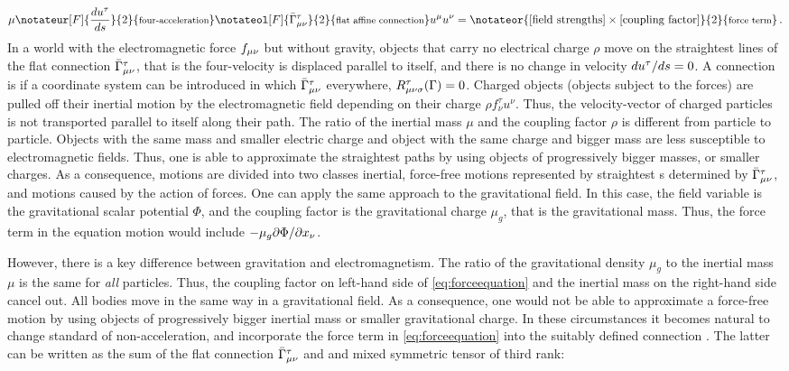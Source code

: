 \documentclass[submitted]{article}
\newcommand{\texts}[1]{\text{\footnotesize{#1}}}
\newcommand{\faraday}{\ensuremath{f}}
\newcommand{\christoffelmnt}{\christoffel{\mu}{\nu}{\tau}}
\newcommand{\Gtmnbar}{\ensuremath{\bar{\Gamma}\tmn}\xspace}
\begin{document}
\begin{equation}
\label{eq:forceequation} 
\mu \notateur[F]{\frac{du^\tau}{\dap}}{2}{\texts{four-acceleration}} \notateol[F]{\Gtmnbar}{2}{\texts{flat affine connection}} u^\mu u^\nu = \notateor{\text{[field strengths]} \times \text{[coupling factor]}}{2}{\texts{force term}} \,.
\end{equation}
In a world with the electro­magnetic force $\faraday\mn$ but without gravity, objects that carry no electrical charge $\rho$ move on the straightest lines of the flat connection $\Gtmnbar$, that is the four-velocity is displaced parallel to itself, and there is no change in velocity ${du^\tau}/{ds}=0$. A connection is  if a coordinate system can be introduced in which $\Gtmnbar$ everywhere, \ie $R_{\mu \nu \sigma}^{\tau}(\Gamma)=0$. Charged objects (objects subject to the forces) are pulled off their inertial motion by the electromagnetic field depending on their charge $\rho f^\tau_\nu u^\nu$. Thus, the velocity-vector of charged particles is not transported parallel to itself along their path. The ratio of the inertial mass $\mu$ and the coupling factor $\rho$ is different from particle to particle. Objects with the same mass and smaller electric charge and object with the same charge and bigger mass are less susceptible to electromagnetic fields. Thus, one is able to approximate the straightest paths by using objects of progressively bigger masses, or smaller charges. As a consequence, motions are divided into two classes inertial, force-free motions represented by straightest \wl{}s determined by $\Gtmnbar$, and motions caused by the action of forces. One can apply the same approach to the gravitational field. In this case, the field variable is the gravitational scalar potential $\Phi$, and the coupling factor is the gravitational charge $\mu_g$, that is the gravitational mass. Thus, the force term in the equation motion would include $-\mu_g {\partial \Phi}/{\partial x_\nu}$. 


However, there is a key difference between gravitation and  electromagnetism. The ratio of the gravitational  density $\mu_g$ to the inertial mass $\mu$ is the same for \emph{all} particles. Thus, the coupling factor on left-hand side of \cref{eq:forceequation} and the inertial mass on the right-hand side cancel out. All bodies move in the same way in a gravitational field. As a consequence, one would not be able to approximate a force-free motion by using objects of progressively bigger inertial mass or smaller gravitational charge. In these circumstances it becomes natural to change standard of non-acceleration, and incorporate the force term in \cref{eq:forceequation} into the suitably defined connection \Gtmn. The latter can be written as the sum of the flat connection \Gtmnbar and and mixed symmetric tensor of third rank: 
\end{document}
